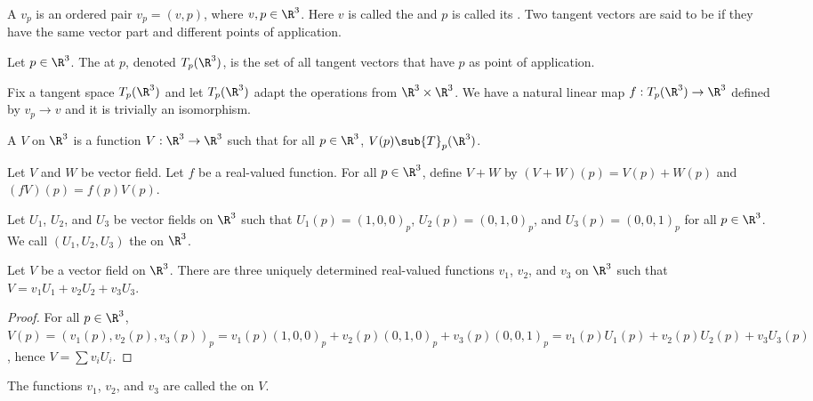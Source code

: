 \documentclass[10pt]{article}
\begin{document}
\begin{definition}
    A  ${v}_{p}$ is an ordered pair ${v}_{p}=(v,p)$, where $v,p\in{\R}^{3}$. Here $v$ is called the  and $p$ is called its . Two tangent vectors are said to be  if they have the same vector part and different points of application.
\end{definition}
\begin{definition}
    Let $p\in{\R}^{3}$. The  at $p$, denoted ${T}_{p}({\R}^{3})$, is the set of all tangent vectors that have $p$ as point of application.
\end{definition}
\par
Fix a tangent space ${T}_{p}({\R}^{3})$ and let ${T}_{p}({\R}^{3})$ adapt the operations from ${\R}^{3}\times{\R}^{3}$. We have a natural linear map $f:{T}_{p}({\R}^{3})\to{\R}^{3}$ defined by ${v}_{p}\to v$ and it is trivially an isomorphism.
\begin{definition}
    A  $V$ on ${\R}^{3}$ is a function $V:{\R}^{3}\to{\R}^{3}$ such that for all $p\in{\R}^{3}$, $V(p)\sub{T}_{p}({\R}^{3})$.
\end{definition}
\par
Let $V$ and $W$ be vector field. Let $f$ be a real-valued function. For all $p\in{\R}^{3}$, define $V+W$ by $(V+W)(p)=V(p)+W(p)$ and $(fV)(p)=f(p)V(p)$.
\begin{definition}
    Let ${U}_{1}$, ${U}_{2}$, and ${U}_{3}$ be vector fields on ${\R}^{3}$ such that ${U}_{1}(p)={(1,0,0)}_{p}$, ${U}_{2}(p)={(0,1,0)}_{p}$, and ${U}_{3}(p)={(0,0,1)}_{p}$ for all $p\in{\R}^{3}$. We call $({U}_{1},{U}_{2},{U}_{3})$ the  on ${\R}^{3}$.
\end{definition}
\begin{proposition}
    Let $V$ be a vector field on ${\R}^{3}$. There are three uniquely determined real-valued functions ${v}_{1}$, ${v}_{2}$, and ${v}_{3}$ on ${\R}^{3}$ such that $V={v}_{1}{U}_{1}+{v}_{2}{U}_{2}+{v}_{3}{U}_{3}$.
\end{proposition}
\begin{proof}
    For all $p\in{\R}^{3}$, $V(p)={({v}_{1}(p),{v}_{2}(p),{v}_{3}(p))}_{p}={v}_{1}(p){(1,0,0)}_{p}+{v}_{2}(p){(0,1,0)}_{p}+{v}_{3}(p){(0,0,1)}_{p}={v}_{1}(p){U}_{1}(p)+{v}_{2}(p){U}_{2}(p)+{v}_{3}{U}_{3}(p)$, hence $V=\sum{v}_{i}{U}_{i}$.
\end{proof}
\par
The functions ${v}_{1}$, ${v}_{2}$, and ${v}_{3}$ are called the  on $V$.
\end{document}

